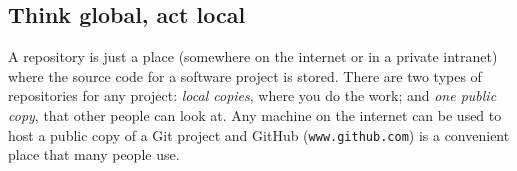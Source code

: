 






\subsection{Think global, act local}
\label{sec:cloning-technology}

A repository is just a place (somewhere on the internet or in a
private intranet) where the source code for a software project is
stored. There are two types of repositories for any project:
\emph{local copies}, where you do the work; and \emph{one public
  copy}, that other people can look at.  Any machine on the internet
can be used to host a public copy of a Git project and GitHub
(\verb+www.github.com+) is a convenient place that many people use.

